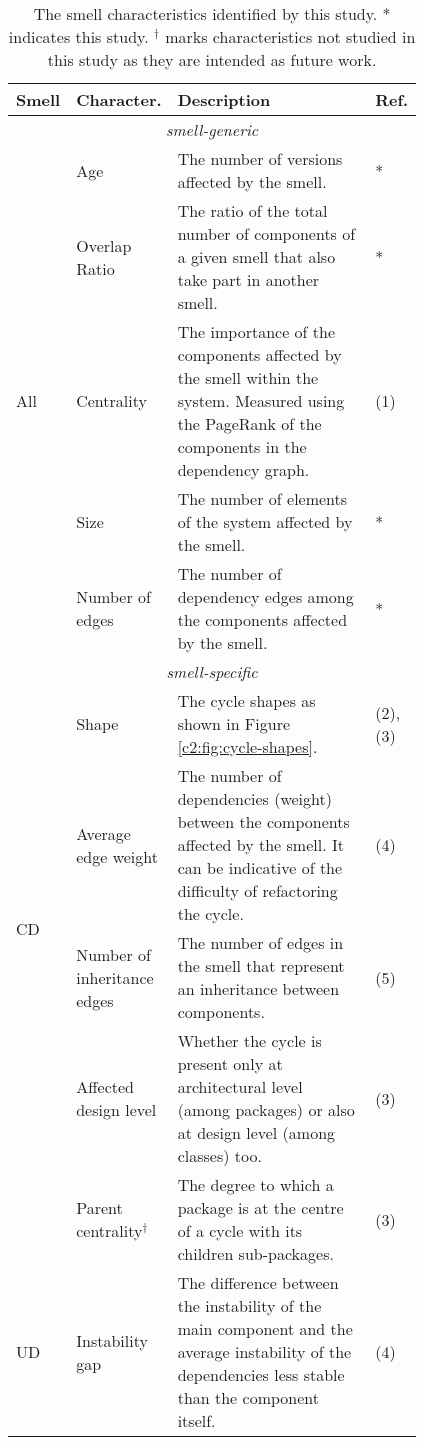 \begin{table}[]
    \footnotesize
    \centering
    \caption{The smell characteristics identified by this study. * indicates this study. $^\dagger$ marks characteristics not studied in this study as they are intended as future work.}
    \label{tab:smell-characteristics}
    \begin{tabular}{p{0.035\linewidth}p{0.15\linewidth}p{0.60\linewidth}p{0.025\linewidth}}
    \toprule
    \textbf{Smell} & \textbf{Character.} & \textbf{Description} & \textbf{Ref.} \\ \midrule
    \multicolumn{4}{c}{\itshape smell-generic}\\\midrule
    \multirow{5}{*}{All} & Age & The number of versions affected by the smell. & * \\
     & Overlap Ratio & The ratio of the total number of components of a given smell that also take part in another smell. & * \\
     & Centrality & The importance of the components affected by the smell within the system. Measured using the PageRank of the components in the dependency graph. & (1) \\
     & Size & The number of elements of the system affected by the smell. & * \\
     & Number of edges & The number of dependency edges among the components affected by the smell. & * \\ \midrule
    \multicolumn{4}{c}{\itshape smell-specific}\\\midrule
    \multirow{4}{0.1\linewidth}{CD} & Shape & The cycle shapes as shown in Figure \ref{c2:fig:cycle-shapes}. & (2), (3)\\
    & Average edge weight &  The number of dependencies (weight) between the components affected by the smell. It can be indicative of the difficulty of refactoring the cycle. & (4)\\
     & Number of inheritance edges & The number of edges in the smell that represent an inheritance between components. & (5) \\
     & Affected design level & Whether the cycle is present only at architectural level (among packages) or also at design level (among classes) too. & (3) \\
     & Parent centrality$^\dagger$ & The degree to which a package is at the centre of a cycle with its children sub-packages. & (3)\\ \midrule
     \multirow{2}{0.1\linewidth}{UD} & Instability gap & The difference between the instability of the main component and the average instability of the dependencies less stable than the component itself. & (4) \\

\end{tabular}
\end{table}
